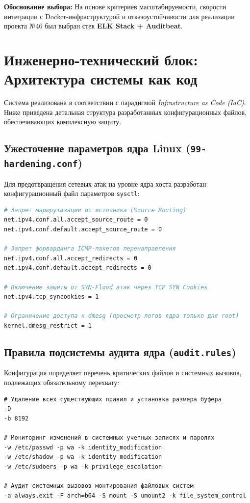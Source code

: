\documentclass[a4paper,12pt]{article}
\begin{document}
\textbf{Обоснование выбора:} На основе критериев масштабируемости, скорости интеграции с Docker-инфраструктурой и отказоустойчивости для реализации проекта №46 был выбран стек \textbf{ELK Stack + Auditbeat}.

\section{Инженерно-технический блок: Архитектура системы как код}

Система реализована в соответствии с парадигмой \textit{Infrastructure as Code (IaC)}. Ниже приведена детальная структура разработанных конфигурационных файлов, обеспечивающих комплексную защиту.

\subsection{Ужесточение параметров ядра Linux (\texttt{99-hardening.conf})}
Для предотвращения сетевых атак на уровне ядра хоста разработан конфигурационный файл параметров \texttt{sysctl}:

\begin{lstlisting}[language=bash, caption=Конфигурация config/sysctl.d/99-hardening.conf]
# Запрет маршрутизации от источника (Source Routing)
net.ipv4.conf.all.accept_source_route = 0
net.ipv4.conf.default.accept_source_route = 0

# Запрет форвардинга ICMP-пакетов перенаправления
net.ipv4.conf.all.accept_redirects = 0
net.ipv4.conf.default.accept_redirects = 0

# Включение защиты от SYN-Flood атак через TCP SYN Cookies
net.ipv4.tcp_syncookies = 1

# Ограничение доступа к dmesg (просмотр логов ядра только для root)
kernel.dmesg_restrict = 1
\end{lstlisting}

\subsection{Правила подсистемы аудита ядра (\texttt{audit.rules})}
Конфигурация определяет перечень критических файлов и системных вызовов, подлежащих обязательному перехвату:

\begin{lstlisting}[caption=Конфигурация config/auditd/audit.rules]
# Удаление всех существующих правил и установка размера буфера
-D
-b 8192

# Мониторинг изменений в системных учетных записях и паролях
-w /etc/passwd -p wa -k identity_modification
-w /etc/shadow -p wa -k identity_modification
-w /etc/sudoers -p wa -k privilege_escalation

# Аудит системных вызовов монтирования файловых систем
-a always,exit -F arch=b64 -S mount -S umount2 -k file_system_control
\end{lstlisting}
\end{document}
